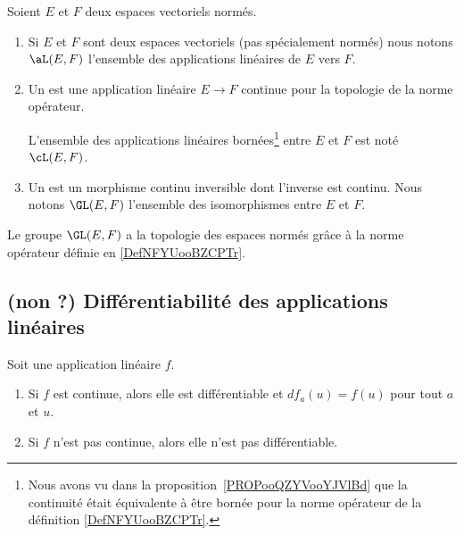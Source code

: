 \begin{definition}         \label{DEFooTLQUooJvknvi}
	Soient \( E\) et \( F\) deux espaces vectoriels normés.
	\begin{enumerate}
		\item
		      Si \( E\) et \( F\) sont deux espaces vectoriels (pas spécialement normés) nous notons \( \aL(E,F)\) l'ensemble des applications linéaires de \( E\) vers \( F\).
		\item Un  est une application linéaire \( E\to F\) continue pour la topologie de la norme opérateur.

		      L'ensemble des applications linéaires bornées\footnote{Nous avons vu dans la proposition~\ref{PROPooQZYVooYJVlBd} que la continuité était équivalente à être bornée pour la norme opérateur de la définition \ref{DefNFYUooBZCPTr}.} entre \( E\) et \( F\) est noté \( \cL(E,F)\).
		\item
		      Un  est un morphisme continu inversible dont l'inverse est continu. Nous notons \( \GL(E,F)\) l'ensemble des isomorphismes entre \( E\) et \( F\).
	\end{enumerate}
	Le groupe \( \GL(E,F)\) a la topologie des espaces normés grâce à la norme opérateur définie en \ref{DefNFYUooBZCPTr}.
\end{definition}


\subsection{(non ?) Différentiabilité des applications linéaires}

\begin{lemma}       \label{LemooXXUGooUqCjmp}
	Soit une application linéaire \( f\).
	\begin{enumerate}
		\item
		      Si \( f\) est continue, alors elle est différentiable et \( df_a(u)=f(u)\) pour tout \( a\) et \( u\).
		\item
		      Si \( f\) n'est pas continue, alors elle n'est pas différentiable.
	\end{enumerate}
\end{lemma}

